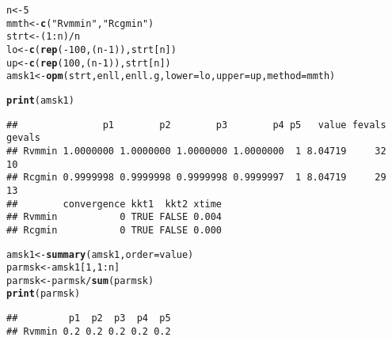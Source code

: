 \documentclass[11pt]{article}\usepackage[]{graphicx}\usepackage[]{color}
\makeatletter
\newcommand{\hlnum}[1]{\textcolor[rgb]{0.686,0.059,0.569}{#1}}%
\newcommand{\hlstr}[1]{\textcolor[rgb]{0.192,0.494,0.8}{#1}}%
\newcommand{\hlopt}[1]{\textcolor[rgb]{0,0,0}{#1}}%
\newcommand{\hlstd}[1]{\textcolor[rgb]{0.345,0.345,0.345}{#1}}%
\newcommand{\hlkwb}[1]{\textcolor[rgb]{0.69,0.353,0.396}{#1}}%
\newcommand{\hlkwc}[1]{\textcolor[rgb]{0.333,0.667,0.333}{#1}}%
\newcommand{\hlkwd}[1]{\textcolor[rgb]{0.737,0.353,0.396}{\textbf{#1}}}%
\newenvironment{kframe}{%
 \def\at@end@of@kframe{}%
 \ifinner\ifhmode%
  \def\at@end@of@kframe{\end{minipage}}%
  \begin{minipage}{\columnwidth}%
 \fi\fi%
 \def\FrameCommand##1{\hskip\@totalleftmargin \hskip-\fboxsep
 \colorbox{shadecolor}{##1}\hskip-\fboxsep
     \hskip-\linewidth \hskip-\@totalleftmargin \hskip\columnwidth}%
 \MakeFramed {\advance\hsize-\width
   \@totalleftmargin\z@ \linewidth\hsize
   \@setminipage}}%
 {\par\unskip\endMakeFramed%
 \at@end@of@kframe}
\newenvironment{knitrout}{}{} %
\makeatother
\begin{document}
\begin{knitrout}\scriptsize
{}\color{fgcolor}\begin{kframe}
\begin{alltt}
\hlstd{n}\hlkwb{<-}\hlnum{5}
\hlstd{mmth} \hlkwb{<-} \hlkwd{c}\hlstd{(}\hlstr{"Rvmmin"}\hlstd{,} \hlstr{"Rcgmin"}\hlstd{)}
\hlstd{strt} \hlkwb{<-} \hlstd{(}\hlnum{1}\hlopt{:}\hlstd{n)}\hlopt{/}\hlstd{n}
\hlstd{lo} \hlkwb{<-} \hlkwd{c}\hlstd{(}\hlkwd{rep}\hlstd{(}\hlopt{-}\hlnum{100}\hlstd{, (n}\hlopt{-}\hlnum{1}\hlstd{)),strt[n])}
\hlstd{up} \hlkwb{<-} \hlkwd{c}\hlstd{(}\hlkwd{rep}\hlstd{(}\hlnum{100}\hlstd{, (n}\hlopt{-}\hlnum{1}\hlstd{)),strt[n])}
\hlstd{amsk1} \hlkwb{<-} \hlkwd{opm}\hlstd{(strt, enll, enll.g,} \hlkwc{lower}\hlstd{=lo,} \hlkwc{upper}\hlstd{=up,} \hlkwc{method}\hlstd{=mmth)}
\end{alltt}


{\ttfamily\noindent\color{warningcolor}{\#\# Warning in bmchk(par, lower = lower, upper = upper): Masks (fixed parameters) set by bmchk due to tight bounds. CAUTION!!}}

{\ttfamily\noindent\color{warningcolor}{\#\# Warning in bmchk(par, lower = lower, upper = upper): Masks (fixed parameters) set by bmchk due to tight bounds. CAUTION!!}}

{\ttfamily\noindent\color{warningcolor}{\#\# Warning in bmchk(par, lower = lower, upper = upper): Masks (fixed parameters) set by bmchk due to tight bounds. CAUTION!!}}\begin{alltt}
\hlkwd{print}\hlstd{(amsk1)}
\end{alltt}
\begin{verbatim}
##               p1        p2        p3        p4 p5   value fevals gevals
## Rvmmin 1.0000000 1.0000000 1.0000000 1.0000000  1 8.04719     32     10
## Rcgmin 0.9999998 0.9999998 0.9999998 0.9999997  1 8.04719     29     13
##        convergence kkt1  kkt2 xtime
## Rvmmin           0 TRUE FALSE 0.004
## Rcgmin           0 TRUE FALSE 0.000
\end{verbatim}
\begin{alltt}
\hlstd{amsk1} \hlkwb{<-} \hlkwd{summary}\hlstd{(amsk1,} \hlkwc{order}\hlstd{=value)}
\hlstd{parmsk} \hlkwb{<-} \hlstd{amsk1[}\hlnum{1}\hlstd{,} \hlnum{1}\hlopt{:}\hlstd{n]}
\hlstd{parmsk} \hlkwb{<-} \hlstd{parmsk}\hlopt{/}\hlkwd{sum}\hlstd{(parmsk)}
\hlkwd{print}\hlstd{(parmsk)}
\end{alltt}
\begin{verbatim}
##         p1  p2  p3  p4  p5
## Rvmmin 0.2 0.2 0.2 0.2 0.2
\end{verbatim}
\end{kframe}
\end{knitrout}
\end{document}
